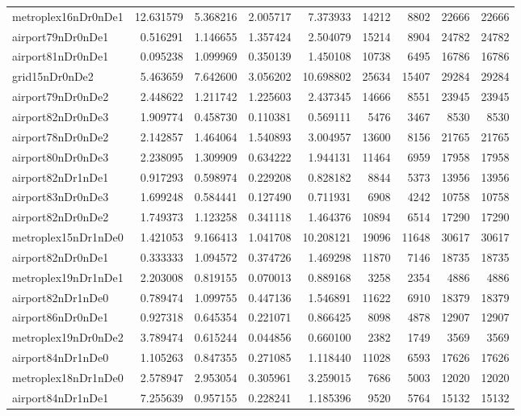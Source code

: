 \begin{longtable}{|l|r|r|r|r|r|r|r|r|}
metroplex16nDr0nDe1 & 12.631579 & 5.368216 & 2.005717 & 7.373933 & 14212 & 8802 & 22666 & 22666 \\
airport79nDr0nDe1 & 0.516291 & 1.146655 & 1.357424 & 2.504079 & 15214 & 8904 & 24782 & 24782 \\
airport81nDr0nDe1 & 0.095238 & 1.099969 & 0.350139 & 1.450108 & 10738 & 6495 & 16786 & 16786 \\
grid15nDr0nDe2 & 5.463659 & 7.642600 & 3.056202 & 10.698802 & 25634 & 15407 & 29284 & 29284 \\
airport79nDr0nDe2 & 2.448622 & 1.211742 & 1.225603 & 2.437345 & 14666 & 8551 & 23945 & 23945 \\
airport82nDr0nDe3 & 1.909774 & 0.458730 & 0.110381 & 0.569111 & 5476 & 3467 & 8530 & 8530 \\
airport78nDr0nDe2 & 2.142857 & 1.464064 & 1.540893 & 3.004957 & 13600 & 8156 & 21765 & 21765 \\
airport80nDr0nDe3 & 2.238095 & 1.309909 & 0.634222 & 1.944131 & 11464 & 6959 & 17958 & 17958 \\
airport82nDr1nDe1 & 0.917293 & 0.598974 & 0.229208 & 0.828182 & 8844 & 5373 & 13956 & 13956 \\
airport83nDr0nDe3 & 1.699248 & 0.584441 & 0.127490 & 0.711931 & 6908 & 4242 & 10758 & 10758 \\
airport82nDr0nDe2 & 1.749373 & 1.123258 & 0.341118 & 1.464376 & 10894 & 6514 & 17290 & 17290 \\
metroplex15nDr1nDe0 & 1.421053 & 9.166413 & 1.041708 & 10.208121 & 19096 & 11648 & 30617 & 30617 \\
airport82nDr0nDe1 & 0.333333 & 1.094572 & 0.374726 & 1.469298 & 11870 & 7146 & 18735 & 18735 \\
metroplex19nDr1nDe1 & 2.203008 & 0.819155 & 0.070013 & 0.889168 & 3258 & 2354 & 4886 & 4886 \\
airport82nDr1nDe0 & 0.789474 & 1.099755 & 0.447136 & 1.546891 & 11622 & 6910 & 18379 & 18379 \\
airport86nDr0nDe1 & 0.927318 & 0.645354 & 0.221071 & 0.866425 & 8098 & 4878 & 12907 & 12907 \\
metroplex19nDr0nDe2 & 3.789474 & 0.615244 & 0.044856 & 0.660100 & 2382 & 1749 & 3569 & 3569 \\
airport84nDr1nDe0 & 1.105263 & 0.847355 & 0.271085 & 1.118440 & 11028 & 6593 & 17626 & 17626 \\
metroplex18nDr1nDe0 & 2.578947 & 2.953054 & 0.305961 & 3.259015 & 7686 & 5003 & 12020 & 12020 \\
airport84nDr1nDe1 & 7.255639 & 0.957155 & 0.228241 & 1.185396 & 9520 & 5764 & 15132 & 15132 \\

\end{longtable}
